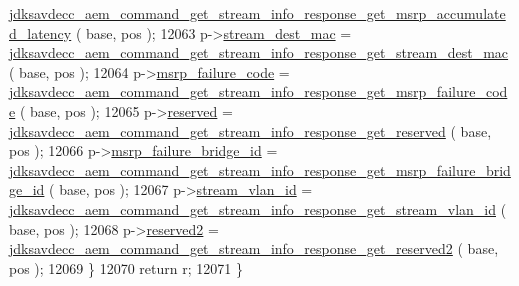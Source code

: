 \begin{DoxyCode}
      \hyperlink{group__command__get__stream__info__response_gadb7c867b9a119e2954e0571040afbf73}{jdksavdecc\_aem\_command\_get\_stream\_info\_response\_get\_msrp\_accumulated\_latency}
      ( base, pos );
12063         p->\hyperlink{structjdksavdecc__aem__command__get__stream__info__response_acb9f6beb748e2b0e9086f809a4b3143d}{stream\_dest\_mac} = 
      \hyperlink{group__command__get__stream__info__response_ga7af5b92a59616d75d3eaef854b288286}{jdksavdecc\_aem\_command\_get\_stream\_info\_response\_get\_stream\_dest\_mac}
      ( base, pos );
12064         p->\hyperlink{structjdksavdecc__aem__command__get__stream__info__response_ad3d0b0a294bb35f39b361259730159d7}{msrp\_failure\_code} = 
      \hyperlink{group__command__get__stream__info__response_gafe1f00653ff44ce4d64da0d4a93afb91}{jdksavdecc\_aem\_command\_get\_stream\_info\_response\_get\_msrp\_failure\_code}
      ( base, pos );
12065         p->\hyperlink{structjdksavdecc__aem__command__get__stream__info__response_acb7bc06bed6f6408d719334fc41698c7}{reserved} = 
      \hyperlink{group__command__get__stream__info__response_ga37141f0ce790f9f64ba2111594590bcb}{jdksavdecc\_aem\_command\_get\_stream\_info\_response\_get\_reserved}
      ( base, pos );
12066         p->\hyperlink{structjdksavdecc__aem__command__get__stream__info__response_ad53a697054b76cf96ebb0d69a8cf8fb8}{msrp\_failure\_bridge\_id} = 
      \hyperlink{group__command__get__stream__info__response_gab22add0a1e19a8f215ba0a92cb01a247}{jdksavdecc\_aem\_command\_get\_stream\_info\_response\_get\_msrp\_failure\_bridge\_id}
      ( base, pos );
12067         p->\hyperlink{structjdksavdecc__aem__command__get__stream__info__response_a8901fae0712dfce7341cdcbe8b43035c}{stream\_vlan\_id} = 
      \hyperlink{group__command__get__stream__info__response_gab5999235219bc06614133a9a61098cc7}{jdksavdecc\_aem\_command\_get\_stream\_info\_response\_get\_stream\_vlan\_id}
      ( base, pos );
12068         p->\hyperlink{structjdksavdecc__aem__command__get__stream__info__response_a0fc429b055e74830a4583ec37f5c3846}{reserved2} = 
      \hyperlink{group__command__get__stream__info__response_ga7788b2f53bac2826facefbac32e10572}{jdksavdecc\_aem\_command\_get\_stream\_info\_response\_get\_reserved2}
      ( base, pos );
12069     \}
12070     \textcolor{keywordflow}{return} r;
12071 \}
\end{DoxyCode}


